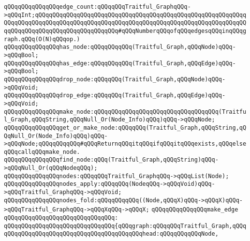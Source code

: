 \verb|qQQqqQQqqQQqqQQqedge_count:qQQqqQQqTraitful_GraphqQQq->qQQqInt;qQQqqQQqqQQqqQQqqQQqqQQqqQQqqQQqqQQqqQQqqQQqqQQqqQQqqQQqqQQqqQQqqQQqqQQqqQQqqQQqqQQqqQQqqQQqqQQqqQQqqQQqqQQqqQQqqQQqqQQqqQQqqQQqqQQqqQQqqQQqqQQqqQQqqQQqqQQqqQQqqQQq#qQQqNumberqQQqofqQQqedgesqQQqinqQQqgraph.qQQq(O(N)qQQqop.)|\newline
\newline
\verb|qQQqqQQqqQQqqQQqhas_node:qQQqqQQqqQQq(Traitful_Graph,qQQqNode)qQQq->qQQqBool;|\newline
\verb|qQQqqQQqqQQqqQQqhas_edge:qQQqqQQqqQQq(Traitful_Graph,qQQqEdge)qQQq->qQQqBool;|\newline
\verb|qQQqqQQqqQQqqQQqdrop_node:qQQqqQQq(Traitful_Graph,qQQqNode)qQQq->qQQqVoid;|\newline
\verb|qQQqqQQqqQQqqQQqdrop_edge:qQQqqQQq(Traitful_Graph,qQQqEdge)qQQq->qQQqVoid;|\newline
\newline
\verb|qQQqqQQqqQQqqQQqmake_node:qQQqqQQqqQQqqQQqqQQqqQQqqQQqqQQqqQQq(Traitful_Graph,qQQqString,qQQqNull_Or(Node_Info)qQQq)qQQq->qQQqNode;|\newline
\verb|qQQqqQQqqQQqqQQqget_or_make_node:qQQqqQQq(Traitful_Graph,qQQqString,qQQqNull_Or(Node_Info)qQQq)qQQq->qQQqNode;qQQqqQQqqQQq#qQQqReturnqQQqitqQQqifqQQqitqQQqexists,qQQqelseqQQqcallqQQqmake_node.|\newline
\newline
\verb|qQQqqQQqqQQqqQQqfind_node:qQQq(Traitful_Graph,qQQqString)qQQq->qQQqNull_Or(qQQqNodeqQQq);|\newline
\newline
\verb|qQQqqQQqqQQqqQQqnodes:qQQqqQQqTraitful_GraphqQQq->qQQqList(Node);|\newline
\newline
\verb|qQQqqQQqqQQqqQQqnodes_apply:qQQqqQQq(NodeqQQq->qQQqVoid)qQQq->qQQqTraitful_GraphqQQq->qQQqVoid;|\newline
\newline
\verb|qQQqqQQqqQQqqQQqnodes_fold:qQQqqQQqqQQq((Node,qQQqX)qQQq->qQQqX)qQQq->qQQqTraitful_GraphqQQq->qQQqXqQQq->qQQqX;|\newline
\newline
\verb|qQQqqQQqqQQqqQQqmake_edge|\newline
\verb|qQQqqQQqqQQqqQQqqQQqqQQqqQQqqQQq:|\newline
\verb|qQQqqQQqqQQqqQQqqQQqqQQqqQQqqQQq{qQQqgraph:qQQqqQQqTraitful_Graph,qQQq|\newline
\verb|qQQqqQQqqQQqqQQqqQQqqQQqqQQqqQQqqQQqqQQqhead:qQQqqQQqqQQqNode,|\newline
